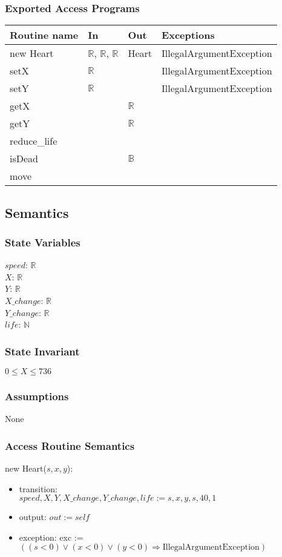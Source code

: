 \documentclass[12pt]{article}
\begin{document}
\subsubsection*{Exported Access Programs}
\begin{tabular}{| l | l | l | p{5cm} |}
\hline
\textbf{Routine name} & \textbf{In} & \textbf{Out} & \textbf{Exceptions}\\
\hline
new Heart & $\mathbb{R}$, $\mathbb{R}$, $\mathbb{R}$ & Heart & IllegalArgumentException\\
\hline
setX & $\mathbb{R}$ &  & IllegalArgumentException\\
\hline
setY & $\mathbb{R}$ &  & IllegalArgumentException\\
\hline
getX &    & $\mathbb{R}$ & \\
\hline
getY &    & $\mathbb{R}$ & \\
\hline
reduce\_life & & & \\
\hline
isDead & & $\mathbb{B}$ & \\
\hline
move & & &\\
\hline
\end{tabular}

\subsection*{Semantics}
\subsubsection*{State Variables}
$\mathit{speed}$: $\mathbb{R}$\\
$\mathit{X}$: $\mathbb{R}$\\
$\mathit{Y}$: $\mathbb{R}$\\
$\mathit{X\_change}$: $\mathbb{R}$\\
$\mathit{Y\_change}$: $\mathbb{R}$\\
$\mathit{life}$: $\mathbb{N}$
\subsubsection*{State Invariant}
$0 \leq X \leq 736$
\subsubsection*{Assumptions}
None
\subsubsection*{Access Routine Semantics}
\noindent new Heart($\mathit{s}, \mathit{x}, \mathit{y}$):
\begin{itemize}
\item transition: \\$\mathit{speed}, \mathit{X}, \mathit{Y}, \mathit{X\_change}, \mathit{Y\_change}, \mathit{life} := \mathit{s}, \mathit{x},
  \mathit{y}, \mathit{s}, 40, 1$
\item output: $out := \mathit{self}$
\item exception: exc := $((\mathit{s} < 0) \vee (\mathit{x} < 0) \vee 
  (\mathit{y} < 0) \Rightarrow \text{IllegalArgumentException})$
\end{itemize}
\end{document}
